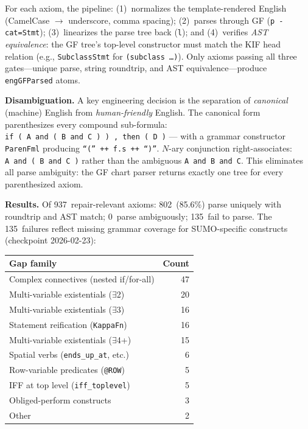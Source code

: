 \documentclass[11pt]{article}
\theoremstyle{definition}
\theoremstyle{plain}
\begin{document}
For each axiom, the pipeline: (1)~normalizes the template-rendered
English (CamelCase $\to$ underscore, comma spacing);
(2)~parses through GF (\texttt{p~-cat=Stmt});
(3)~linearizes the parse tree back (\texttt{l}); and
(4)~verifies \emph{AST equivalence}: the GF tree's top-level
constructor must match the KIF head relation
(e.g., \texttt{SubclassStmt} for \texttt{(subclass~\ldots)}).
Only axioms passing all three gates---unique parse, string
roundtrip, and AST equivalence---produce \texttt{engGFParsed}
atoms.

\medskip\noindent\textbf{Disambiguation.}
A key engineering decision is the separation of
\emph{canonical} (machine) English from \emph{human-friendly}
English.  The canonical form parenthesizes every compound
sub-formula: \texttt{if~(~A~and~(~B~and~C~)~)~,~then~(~D~)}
--- with a grammar constructor \texttt{ParenFml} producing
\texttt{``(''~++~f.s~++~``)''}.  $N$-ary conjunction
right-associates: \texttt{A~and~(~B~and~C~)} rather than
the ambiguous \texttt{A~and~B~and~C}.  This eliminates
all parse ambiguity: the GF chart parser returns exactly
one tree for every parenthesized axiom.

\medskip\noindent\textbf{Results.}
Of 937~repair-relevant axioms: 802~(85.6\%) parse uniquely with
roundtrip and AST match; 0~parse ambiguously; 135~fail to parse.
The 135~failures reflect missing grammar coverage for
SUMO-specific constructs (checkpoint 2026-02-23):

\begin{center}\small
\begin{tabular}{@{}lr@{}}
\toprule
\textbf{Gap family} & \textbf{Count} \\
\midrule
Complex connectives (nested if/for-all) & 47 \\
Multi-variable existentials ($\exists$2) & 20 \\
Multi-variable existentials ($\exists$3) & 16 \\
Statement reification (\texttt{KappaFn}) & 16 \\
Multi-variable existentials ($\exists$4+) & 15 \\
Spatial verbs (\texttt{ends\_up\_at}, etc.) & 6 \\
Row-variable predicates (\texttt{@ROW}) & 5 \\
IFF at top level (\texttt{iff\_toplevel}) & 5 \\
Obliged-perform constructs & 3 \\
Other & 2 \\
\bottomrule
\end{tabular}
\end{center}
\end{document}
